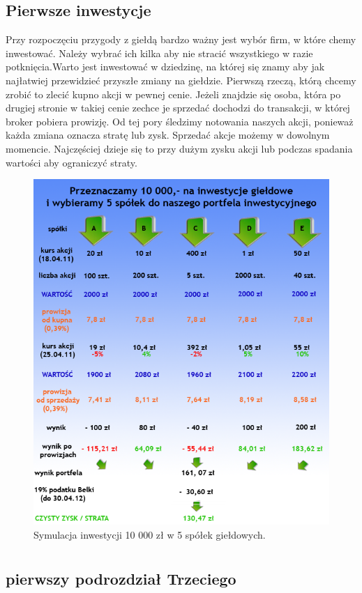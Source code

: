 \documentclass{report}
\begin{document}
\section{Pierwsze inwestycje}
Przy rozpoczęciu przygody z giełdą bardzo ważny jest wybór firm, w które chemy inwestować. Należy wybrać ich kilka aby nie stracić wszystkiego w razie potknięcia.Warto jest inwestować w dziedzinę, na której się znamy aby jak najłatwiej przewidzieć przyszłe zmiany na giełdzie. Pierwszą rzeczą, którą chcemy zrobić to zlecić kupno akcji w pewnej cenie. Jeżeli znajdzie się osoba, która po drugiej stronie w takiej cenie zechce je sprzedać dochodzi do transakcji, w której broker pobiera prowizję.
Od tej pory śledzimy notowania naszych akcji, ponieważ każda zmiana oznacza stratę lub zysk. Sprzedać akcje możemy w dowolnym momencie. Najczęściej dzieje się to przy dużym zysku akcji lub podczas spadania wartości aby ograniczyć straty.\begin{figure}[h]
\centering
\includegraphics[scale=0.6]{tabela}
\caption{Symulacja inwestycji 10 000 zł w 5 spółek giełdowych.\cite{sym11}}
\end{figure}
\newpage
\chapter{}
\section{pierwszy podrozdział Trzeciego}
\newpage
\listoffigures


\end{document}
